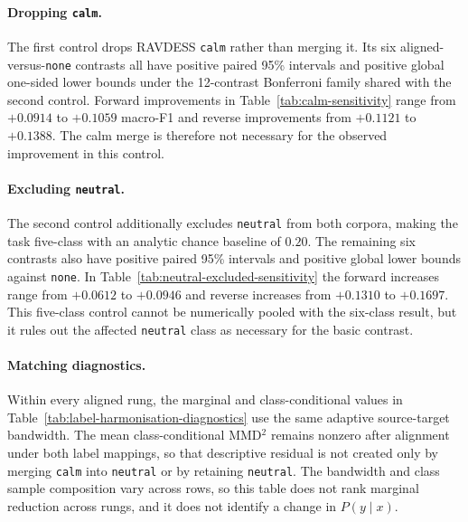 \documentclass[a4paper,fleqn]{cas-dc}
\begin{document}
\paragraph{Dropping \texttt{calm}.} The first control drops RAVDESS
\texttt{calm} rather than merging it. Its six aligned-versus-\texttt{none}
contrasts all have positive paired 95\% intervals and positive global one-sided
lower bounds under the 12-contrast Bonferroni family shared with the second
control. Forward improvements in Table~\ref{tab:calm-sensitivity} range from
$+0.0914$ to $+0.1059$ macro-F1 and
reverse improvements from $+0.1121$ to $+0.1388$. The calm merge is therefore
not necessary for the observed improvement in this control.



\paragraph{Excluding \texttt{neutral}.} The second control additionally excludes
\texttt{neutral} from both corpora, making the task five-class with an analytic
chance baseline of $0.20$. The remaining six contrasts also have positive paired
95\% intervals and positive global lower bounds against \texttt{none}.
In Table~\ref{tab:neutral-excluded-sensitivity} the forward
increases range from $+0.0612$ to $+0.0946$ and reverse increases from $+0.1310$
to $+0.1697$. This five-class control cannot be numerically pooled with the
six-class result, but it rules out the affected \texttt{neutral} class as
necessary for the basic contrast.



\paragraph{Matching diagnostics.} Within every aligned rung, the marginal and
class-conditional values in Table~\ref{tab:label-harmonisation-diagnostics}
use the same adaptive source-target bandwidth.
The mean class-conditional MMD$^2$ remains nonzero after alignment under both
label mappings, so that descriptive residual is not created only by merging
\texttt{calm} into \texttt{neutral} or by retaining \texttt{neutral}. The
bandwidth and class sample composition vary across rows, so this table does not
rank marginal reduction across rungs, and it does not identify a change in
$P(y \mid x)$.


\end{document}
